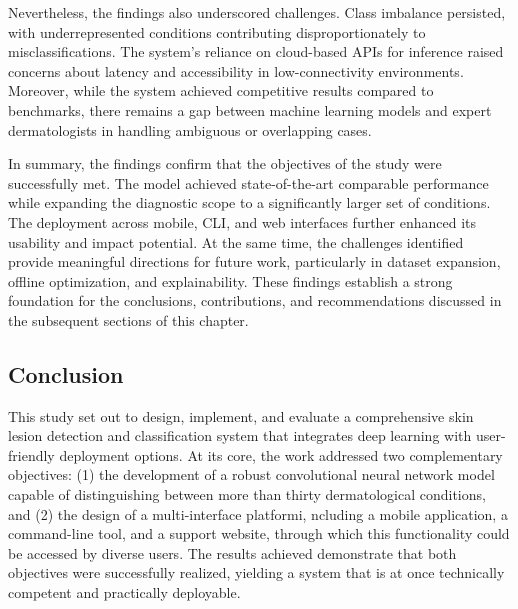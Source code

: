 \documentclass[
  12pt,
  oneside]{article}
\begin{document}
Nevertheless, the findings also underscored challenges. Class imbalance
persisted, with underrepresented conditions contributing
disproportionately to misclassifications. The system's reliance on
cloud-based APIs for inference raised concerns about latency and
accessibility in low-connectivity environments. Moreover, while the
system achieved competitive results compared to benchmarks, there
remains a gap between machine learning models and expert dermatologists
in handling ambiguous or overlapping cases.

In summary, the findings confirm that the objectives of the study were
successfully met. The model achieved state-of-the-art comparable
performance while expanding the diagnostic scope to a significantly
larger set of conditions. The deployment across mobile, CLI, and web
interfaces further enhanced its usability and impact potential. At the
same time, the challenges identified provide meaningful directions for
future work, particularly in dataset expansion, offline optimization,
and explainability. These findings establish a strong foundation for the
conclusions, contributions, and recommendations discussed in the
subsequent sections of this chapter.

\subsection{Conclusion}\label{conclusion-4}

This study set out to design, implement, and evaluate a comprehensive
skin lesion detection and classification system that integrates deep
learning with user-friendly deployment options. At its core, the work
addressed two complementary objectives: (1) the development of a robust
convolutional neural network model capable of distinguishing between
more than thirty dermatological conditions, and (2) the design of a
multi-interface platformi, ncluding a mobile application, a command-line
tool, and a support website, through which this functionality could be
accessed by diverse users. The results achieved demonstrate that both
objectives were successfully realized, yielding a system that is at once
technically competent and practically deployable.
\end{document}
